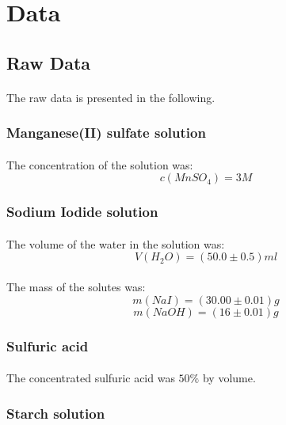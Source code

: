 \documentclass[a4paper]{article}
\begin{document}
\section{Data}

\subsection{Raw Data}

\paragraph*{}
The raw data is presented in the following.

\subsubsection{Manganese(II) sulfate solution}

\paragraph*{}
The concentration of the solution was:
$$c(MnSO_4) = 3\si{M}$$

\subsubsection{Sodium Iodide solution}

\paragraph*{}
The volume of the water in the solution was:
$$V(H_2O) = (50.0 \pm 0.5) \si{ml}$$

\paragraph*{}
The mass of the solutes was:
$$m(NaI) = (30.00 \pm 0.01) \si{g}$$
$$m(NaOH) = (16 \pm 0.01) \si{g}$$

\subsubsection{Sulfuric acid}

\paragraph*{}
The concentrated sulfuric acid was $50\%$ by volume.

\subsubsection{Starch solution}
\end{document}
